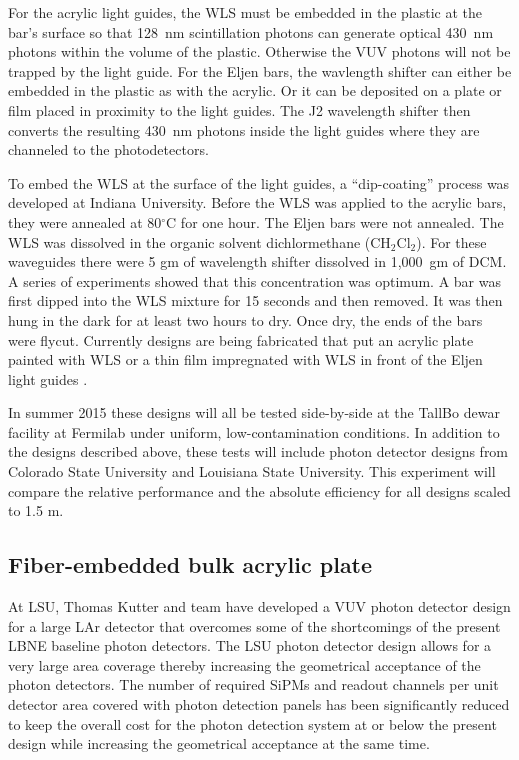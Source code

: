 For the acrylic light guides, the WLS must be embedded in the plastic
at the bar's surface so that 128~nm scintillation photons can generate
optical 430~nm photons within the volume of the plastic.  Otherwise
the VUV photons will not be trapped by the light guide.  For the Eljen
bars, the wavlength shifter can either be embedded in the plastic as
with the acrylic.  Or it can be deposited on a plate or film placed in
proximity to the light guides.  The J2 wavelength shifter then
converts the resulting 430~nm photons inside the light guides where
they are channeled to the photodetectors.

To embed the WLS at the surface of the light guides, a ``dip-coating''
process was developed at Indiana University.  Before the WLS was
applied to the acrylic bars, they were annealed at 80$^\circ$C for one
hour.  The Eljen bars were not annealed.  The WLS was dissolved in the
organic solvent dichlormethane (CH$_2$Cl$_2$).  For these waveguides
there were 5 gm of wavelength shifter dissolved in 1,000~gm of DCM.  A
series of experiments showed that this concentration was optimum.  A
bar was first dipped into the WLS mixture for 15 seconds and then
removed.  It was then hung in the dark for at least two hours to dry.
Once dry, the ends of the bars were flycut.  Currently designs are
being fabricated that put an acrylic plate painted with WLS or a thin
film impregnated with WLS in front of the Eljen light guides .

In summer 2015 these designs will all be tested side-by-side at the
TallBo dewar facility at Fermilab under uniform, low-contamination
conditions.  In addition to the designs described above, these tests
will include photon detector designs from Colorado State University
and Louisiana State University.  This experiment will compare the
relative performance and the absolute efficiency for all designs
scaled to 1.5 m.

\subsection{Fiber-embedded bulk acrylic plate}

At LSU, Thomas Kutter and team have developed a VUV photon detector
design for a large LAr detector that overcomes some of the
shortcomings of the present LBNE baseline photon detectors. The LSU
photon detector design allows for a very large area coverage thereby
increasing the geometrical acceptance of the photon detectors. The
number of required SiPMs and readout channels per unit detector area
covered with photon detection panels has been significantly reduced to
keep the overall cost for the photon detection system at or below the
present design while increasing the geometrical acceptance at the same
time.

